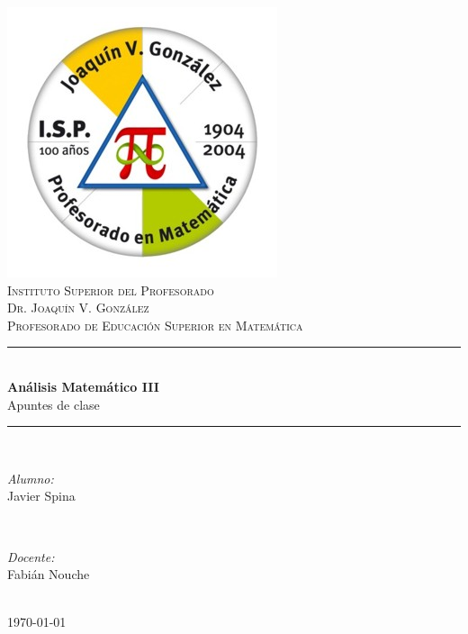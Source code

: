 \documentclass[a4paper,12pt]{article}
\begin{document}
    \newcommand{\HRule}{\rule{\linewidth}{0.5mm}}
    
    
\begin{titlepage}
\center

\includegraphics[scale=0.4]{pin_matematica.jpg}\\[1cm] %
\textsc{\Large Instituto Superior del Profesorado}\\[0.3cm]
\textsc{\LARGE Dr. Joaquín V. González}\\[1cm]
\textsc{\large Profesorado de Educación Superior en Matemática}\\[0.5cm]

\HRule \\[0.4cm]
{\huge \bfseries Análisis Matemático III}\\[0.3cm]
\Large Apuntes de clase\\
\HRule \\[1.5cm]

\begin{minipage}{0.4\textwidth}
\begin{flushleft} 
\large
\emph{Alumno:}\\
Javier Spina
\end{flushleft}
\end{minipage}
~
\begin{minipage}{0.4\textwidth}
\begin{flushright} 
\large
\emph{Docente:}\\
Fabián Nouche
\end{flushright}
\end{minipage}\\[3cm]

\vfill
{\large \today}

\restoregeometry
\end{titlepage}
\end{document}
